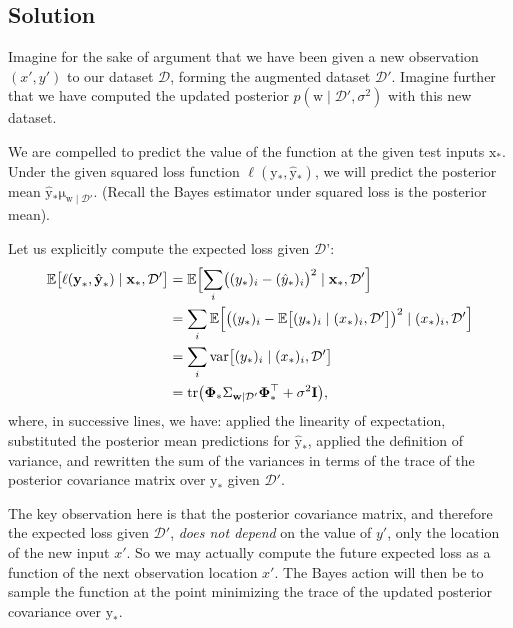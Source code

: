 \documentclass{article}
\newcommand{\given}{\mid}
\newcommand{\mc}[1]{\mathcal{#1}}
\newcommand{\data}{\mc{D}}
\newcommand{\mat}[1]{\bm{\mathrm{#1}}}
\renewcommand{\vec}[1]{\bm{\mathrm{#1}}}
\newcommand{\trans}{^\top}
\DeclareMathOperator{\var}{var}
\DeclareMathOperator{\tr}{tr}
\begin{document}
\subsection*{Solution}

Imagine for the sake of argument that we have been given a new
observation $(x', y')$ to our dataset $\data$, forming the augmented
dataset $\data'$.  Imagine further that we have computed the updated
posterior $p(\vec{w} \given \data', \sigma^2)$ with this new dataset.

We are compelled to predict the value of the function at the given
test inputs $\vec{x}_\ast$.  Under the given squared loss function
$\ell(\vec{y}_\ast, \hat{\vec{y}}_\ast)$, we will predict the
posterior mean $\hat{\vec{y}}_\ast \vec{\mu}_{\vec{w}\given\data'}$.
(Recall the Bayes estimator under squared loss is the posterior mean).

Let us explicitly compute the expected loss given $\data$':
\begin{align*}
  \mathbb{E}\bigl[
    \ell(\vec{y}_\ast, \hat{\vec{y}}_\ast)
    \given
    \vec{x}_\ast,
    \data'
  \bigr]
  &=
  \mathbb{E}\Bigl[
    \sum_i
    \bigl(
    (y_\ast)_i - (\hat{y}_\ast)_i
    \bigr)^2
    \given \vec{x}_\ast, \data'
  \Bigr]
  \\
  &=
  \sum_i
  \mathbb{E}\Bigl[
    \bigl(
    (y_\ast)_i
    -
    \mathbb{E}\bigl[(y_\ast)_i \given (x_\ast)_i, \data'\bigr]
    \bigr)^2
    \given (x_\ast)_i, \data'
    \Bigr]
  \\
  &=
  \sum_i
  \var\bigl[
    (y_\ast)_i
    \given
    (x_\ast)_i, \data'
  \bigr]
  \\
  &=
  \tr
  \bigl(
  \vec{\Phi}_\ast
  \Sigma_{\vec{w}\given\data'}
  \vec{\Phi}_\ast\trans
  +
  \sigma^2 \mat{I}
  \bigr),
\end{align*}
where, in successive lines, we have: applied the linearity of
expectation, substituted the posterior mean predictions for
$\hat{\vec{y}}_\ast$, applied the definition of variance, and
rewritten the sum of the variances in terms of the trace of the
posterior covariance matrix over $\vec{y}_\ast$ given $\data'$.

The key observation here is that the posterior covariance matrix, and
therefore the expected loss given $\data'$, \emph{does not depend} on
the value of $y'$, only the location of the new input $x'$.  So we may
actually compute the future expected loss as a function of the next
observation location $x'$.  The Bayes action will then be to sample
the function at the point minimizing the trace of the updated
posterior covariance over $\vec{y}_\ast$.
\end{document}
